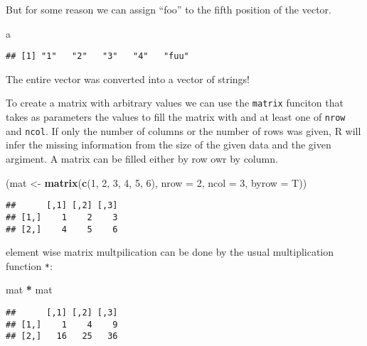\documentclass[]{article}
\newenvironment{Shaded}{\begin{snugshade}}{\end{snugshade}}
\newcommand{\KeywordTok}[1]{\textcolor[rgb]{0.13,0.29,0.53}{\textbf{#1}}}
\newcommand{\DataTypeTok}[1]{\textcolor[rgb]{0.13,0.29,0.53}{#1}}
\newcommand{\DecValTok}[1]{\textcolor[rgb]{0.00,0.00,0.81}{#1}}
\newcommand{\StringTok}[1]{\textcolor[rgb]{0.31,0.60,0.02}{#1}}
\newcommand{\OperatorTok}[1]{\textcolor[rgb]{0.81,0.36,0.00}{\textbf{#1}}}
\newcommand{\NormalTok}[1]{#1}
\begin{document}
But for some reason we can assign ``foo'' to the fifth position of the
vector.

\begin{Shaded}
\begin{Highlighting}[]
\NormalTok{a}
\end{Highlighting}
\end{Shaded}

\begin{verbatim}
## [1] "1"   "2"   "3"   "4"   "fuu"
\end{verbatim}

The entire vector was converted into a vector of strings!

To create a matrix with arbitrary values we can use the \texttt{matrix}
funciton that takes as parameters the values to fill the matrix with and
at least one of \texttt{nrow} and \texttt{ncol}. If only the number of
columns or the number of rows was given, R will infer the missing
information from the size of the given data and the given argiment. A
matrix can be filled either by row owr by column.

\begin{Shaded}
\begin{Highlighting}[]
\NormalTok{(mat <-}\StringTok{ }\KeywordTok{matrix}\NormalTok{(}\KeywordTok{c}\NormalTok{(}\DecValTok{1}\NormalTok{, }\DecValTok{2}\NormalTok{, }\DecValTok{3}\NormalTok{, }\DecValTok{4}\NormalTok{, }\DecValTok{5}\NormalTok{, }\DecValTok{6}\NormalTok{), }\DataTypeTok{nrow =} \DecValTok{2}\NormalTok{, }\DataTypeTok{ncol =} \DecValTok{3}\NormalTok{, }\DataTypeTok{byrow =}\NormalTok{ T))}
\end{Highlighting}
\end{Shaded}

\begin{verbatim}
##      [,1] [,2] [,3]
## [1,]    1    2    3
## [2,]    4    5    6
\end{verbatim}

element wise matrix multpilication can be done by the usual
multiplication function \texttt{*}:

\begin{Shaded}
\begin{Highlighting}[]
\NormalTok{mat }\OperatorTok{*}\StringTok{ }\NormalTok{mat}
\end{Highlighting}
\end{Shaded}

\begin{verbatim}
##      [,1] [,2] [,3]
## [1,]    1    4    9
## [2,]   16   25   36
\end{verbatim}
\end{document}
